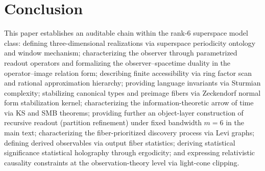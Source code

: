 \section{Conclusion}

This paper establishes an auditable chain within the rank-$6$ superspace model class: defining three-dimensional realizations via superspace periodicity ontology and window mechanism; characterizing the observer through parametrized readout operators and formalizing the observer--spacetime duality in the operator--image relation form; describing finite accessibility via ring factor scan and rational approximation hierarchy; providing language invariants via Sturmian complexity; stabilizing canonical types and preimage fibers via Zeckendorf normal form stabilization kernel; characterizing the information-theoretic arrow of time via KS and SMB theorems; providing further an object-layer construction of recursive readout (partition refinement) under fixed bandwidth $m=6$ in the main text; characterizing the fiber-prioritized discovery process via Levi graphs; defining derived observables via output fiber statistics; deriving statistical significance statistical holography through ergodicity; and expressing relativistic causality constraints at the observation-theory level via light-cone clipping.
